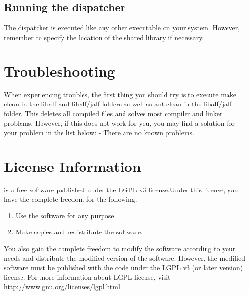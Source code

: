 \subsection{Running the dispatcher}
The dispatcher is executed like any other executable on your system. However, remember to specify the location of the \libalf shared library if necessary.




\section{Troubleshooting}

When experiencing troubles, the first thing you should try is to execute make clean in the libalf and libalf/jalf folders as well as ant clean in the libalf/jalf folder. This deletes all compiled files and solves most compiler and linker problems. However, if this does not work for you, you may find a solution for your problem in the list below:
 - There are no known problems.

\section{License Information}
\libalf is a free software published under the LGPL v3 license.Under this license, you have the complete freedom for the following.
\begin{enumerate}
 \item Use the software for any purpose.
 \item Make copies and redistribute the software.
\end{enumerate}
You also gain the complete freedom to modify the software according to your needs and distribute the modified version of the software. However, the modified software must be published with the code under the LGPL v3 (or later version) license. 
For more information about LGPL license, visit \url{http://www.gnu.org/licenses/lgpl.html}



